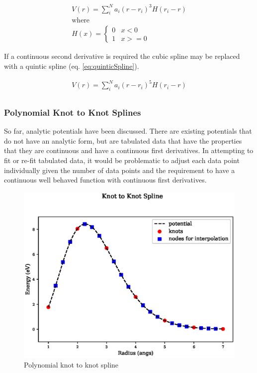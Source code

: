 \begin{equation}
\begin{split}
V(r) = \sum_i^N a_i (r - r_i)^3 H(r_i - r) \\
\text{where } \\
H(x) = \left\{ \begin{matrix} 0 & x<0 \\  1 & x >= 0 \end{matrix} \right . 
\end{split}
\label{eq:cubicSpline}
\end{equation}

If a continuous second derivative is required the cubic spline may be replaced with a quintic spline (eq. \ref{eq:quinticSpline}).

\begin{equation}
\begin{split}
V(r) = \sum_i^N a_i (r - r_i)^5 H(r_i - r) \\
\end{split}
\label{eq:quinticSpline}
\end{equation}


\subsubsection{Polynomial Knot to Knot Splines}

So far, analytic potentials have been discussed.  There are existing potentials that do not have an analytic form, but are tabulated data that have the properties that they are continuous and have a continuous first derivatives.  In attempting to fit or re-fit tabulated data, it would be problematic to adjust each data point individually given the number of data points and the requirement to have a continuous well behaved function with continuous first derivatives.

\begin{figure}[h]
  \begin{center}
    \includegraphics[scale=0.70]{chapters/interatomic_potential_fitting/plots_spline/spline.eps}
    \caption{Polynomial knot to knot spline}
    \label{fig:polynomialknots}
  \end{center}
\end{figure}

